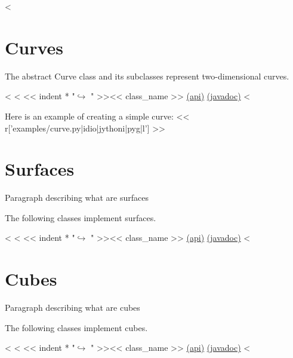 <%

\section{Curves}

The abstract Curve class and its subclasses represent two-dimensional curves.

\begin{fullwidth}
<%
<%
<< indent * "$\hookrightarrow$ " >><< class_name >> \href{http://docs-static.hq.opengamma.com/0.7.0/analytics/api/<< package_name >>.html#class-<<class_name>>}{(api)} \href{http://docs-static.hq.opengamma.com/0.7.0/analytics/javadoc/<< class_name.replace(".","/") >>.html}{(javadoc)}
<%
\end{fullwidth}

Here is an example of creating a simple curve:
<< r['examples/curve.py|idio|jythoni|pyg|l'] >>

\section{Surfaces}

Paragraph describing what are surfaces

The following classes implement surfaces.

\begin{fullwidth}
<%
<%
<< indent * "$\hookrightarrow$ " >><< class_name >> \href{http://docs-static.hq.opengamma.com/0.7.0/analytics/api/<< package_name >>.html#class-<<class_name>>}{(api)} \href{http://docs-static.hq.opengamma.com/0.7.0/analytics/javadoc/<< class_name.replace(".","/") >>.html}{(javadoc)}
<%
\end{fullwidth}

\section{Cubes}

Paragraph describing what are cubes

The following classes implement cubes.

\begin{fullwidth}
<%
<%
<< indent * "$\hookrightarrow$ " >><< class_name >> \href{http://docs-static.hq.opengamma.com/0.7.0/analytics/api/<< package_name >>.html#class-<<class_name>>}{(api)} \href{http://docs-static.hq.opengamma.com/0.7.0/analytics/javadoc/<< class_name.replace(".","/") >>.html}{(javadoc)}
<%
\end{fullwidth}

